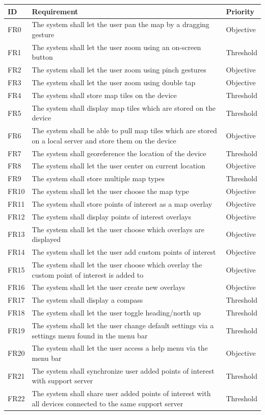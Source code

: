 \documentclass{article}
\begin{document}
\begin{tabular}{ | p{.5in} | p{4.5in} | p{1in}|}
\hline
\textbf{ID} & \textbf{Requirement} & \textbf{Priority}\\
\hline
\hline
FR0 & The system shall let the user pan the map by a dragging gesture & Objective\\
\hline
FR1 & The system shall let the user zoom using an on-screen button & Threshold\\
\hline
FR2 & The system shall let the user zoom using pinch gestures & Objective\\
\hline
FR3 & The system shall let the user zoom using double tap & Objective\\
\hline
FR4 & The system shall store map tiles on the device & Threshold\\
\hline
FR5 & The system shall display map tiles which are stored on the device & Threshold\\
\hline
FR6 & The system shall be able to pull map tiles which are stored on a local server and store them on the device & Objective\\
\hline
FR7 & The system shall georeference the location of the device & Threshold\\
\hline
FR8 & The system shall let the user center on current location & Objective\\
\hline
FR9 & The system shall store multiple map types & Threshold\\
\hline
FR10 & The system shall let the user choose the map type & Objective\\
\hline
FR11 & The system shall store points of interest as a map overlay & Objective\\
\hline
FR12 & The system shall display points of interest overlays & Objective\\
\hline
FR13 & The system shall let the user choose which overlays are displayed & Objective\\
\hline
FR14 & The system shall let the user add custom points of interest & Objective\\
\hline
FR15 & The system shall let the user choose which overlay the custom point of interest is added to & Objective\\
\hline
FR16 & The system shall let the user create new overlays & Objective\\
\hline
FR17 & The system shall display a compass & Threshold\\
\hline
FR18 & The system shall let the user toggle heading/north up & Threshold\\
\hline
FR19 & The system shall let the user change default settings via a settings menu found in the menu bar & Threshold\\
\hline
FR20 & The system shall let the user access a help menu via the menu bar & Objective\\
\hline
FR21 & The system shall synchronize user added points of interest with support server & Threshold\\
\hline
FR22 & The system shall share user added points of interest with all devices connected to the same support server & Threshold\\
\hline
\end{tabular}
\end{document}

